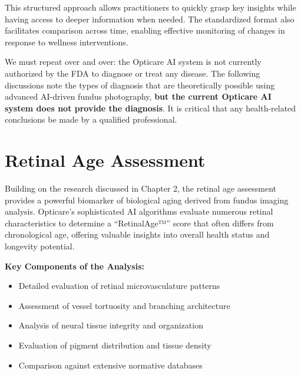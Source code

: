 \documentclass[
  Letterpaper,
]{scrbook}
\providecommand{\tightlist}{%
  \setlength{\itemsep}{0pt}\setlength{\parskip}{0pt}}\usepackage{longtable,booktabs,array}
\begin{document}
This structured approach allows practitioners to quickly grasp key
insights while having access to deeper information when needed. The
standardized format also facilitates comparison across time, enabling
effective monitoring of changes in response to wellness interventions.

\begin{tcolorbox}[enhanced jigsaw, colback=white, colframe=quarto-callout-caution-color-frame, breakable, titlerule=0mm, opacitybacktitle=0.6, bottomtitle=1mm, coltitle=black, opacityback=0, bottomrule=.15mm, toptitle=1mm, colbacktitle=quarto-callout-caution-color!10!white, rightrule=.15mm, leftrule=.75mm, arc=.35mm, title=\textcolor{quarto-callout-caution-color}{\faFire}\hspace{0.5em}{Caution: Not Intended for Diagnosis}, toprule=.15mm, left=2mm]

We must repeat over and over: the Opticare AI system is not currently
authorized by the FDA to diagnose or treat any disease. The following
discussions note the types of diagnosis that are theoretically possible
using advanced AI-driven fundus photography, \textbf{but the current
Opticare AI system does not provide the diagnosis}. It is critical that
any health-related conclusions be made by a qualified professional.

\end{tcolorbox}

\section{Retinal Age Assessment}\label{retinal-age-assessment}

Building on the research discussed in Chapter 2, the retinal age
assessment provides a powerful biomarker of biological aging derived
from fundus imaging analysis. Opticare's sophisticated AI algorithms
evaluate numerous retinal characteristics to determine a ``RetinalAge™''
score that often differs from chronological age, offering valuable
insights into overall health status and longevity potential.

\textbf{Key Components of the Analysis:}

\begin{itemize}
\tightlist
\item
  Detailed evaluation of retinal microvasculature patterns
\item
  Assessment of vessel tortuosity and branching architecture
\item
  Analysis of neural tissue integrity and organization
\item
  Evaluation of pigment distribution and tissue density
\item
  Comparison against extensive normative databases
\end{itemize}
\end{document}
